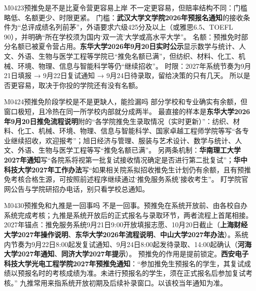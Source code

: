 \begin{qa}{M0423}{预推免是不是比夏令营更容易上岸}
不一定更容易，但赔率结构不同：门槛略低、名额更少、时限更紧。
门槛：\textbf{武汉大学文学院2026年预报名通知}的接收条件为“总评成绩名列前茅”，外语要求六级425分及以上（或雅思6.5、TOEFL 90），并明确“所在学校须为国内‘双一流’大学或高水平大学”。
名额：预推免时部分名额已被夏令营占用。\textbf{东华大学2026年9月20日实时公示}显示数学与统计、人文、外语、生物与医学工程等学院已“推免名额已满”，但纺织、材料、化工、机械、环境、物理、信息与智能科学等仍“继续招收”。
时限：2027年系统节奏为9月21日填报 → 9月22日复试通知 → 9月24日待录取，留给决策的只有几天。
所以是否更容易，取决于你投的学院还有没有名额。
\end{qa}

\begin{qa}{M0424}{预推免阶段学校是不是更缺人，能捡漏吗}
部分学校和专业确实有余额，但窗口极短，且冷热在同一所学校内部就分成两半。
最直接的样本是\textbf{东华大学2026年9月20日推免流程说明}附的“各学院推免生录取情况（实时更新）”：纺织、材料、化工、机械、环境、物理、信息与智能科学、国家卓越工程师学院等写“各专业继续招收，欢迎报考”；旭日经济与管理、服装与艺术设计、数学与统计、人文、外语、生物与医学工程等写“推免名额已满”。
另两条机制：\textbf{华南理工大学2027年通知}写“各院系将视第一批复试接收情况确定是否进行第二批复试”；\textbf{华中科技大学2027年工作办法}写“如果相关院系拟招收推免生计划仍有余额，且有预推免考核合格生源，可按照前述程序继续通过‘推免服务系统’接收考生”。
盯学院官网公告与学院研招办电话，别只看学校总通知。
\end{qa}

\begin{qa}{M0430}{预推免和九推是一回事吗}
不是一回事。预推免在系统开放前、由各校自办系统完成考核；九推是系统开放后的正式报名与录取环节，两者流程上首尾相接。
2027年锚点：推免服务系统9月21日9:00开放填报志愿、10月20日截止（\textbf{上海财经大学2027年操作说明}、\textbf{东华大学2026年流程说明}、\textbf{中山大学2027年办法}）。系统内节奏为9月22日8:00起发复试通知、9月24日8:00起发待录取、14:00起确认（\textbf{河海大学2027年通知}、\textbf{同济大学2027年提示}）。
预推免的作用是提前锁定。\textbf{西安电子科技大学光电工程学院2027年预推免通知}：“参加推免生预报名的学生，其复试成绩以预报名时的考核成绩为准。未进行预报名的学生，须在正式报名后参加复试考核。”
九推常用来指系统开放初期及后续补录窗口。以该校当年通知为准。
\end{qa}

